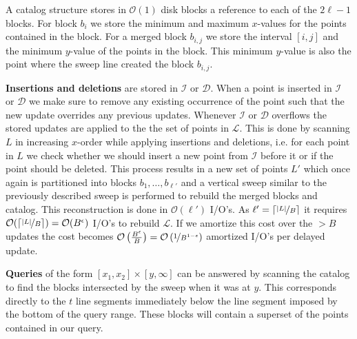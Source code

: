 \documentclass[twoside,11pt,openright]{report}
\begin{document}
A catalog structure stores in $\mathcal{O}(1)$ disk blocks a reference to each of the $2\ell-1$ blocks. For block $b_i$ we store the minimum and maximum $x$-values for the points contained in the block. For a merged block $b_{i,j}$ we store the interval $\left[ i,j\right]$ and the minimum $y$-value of the points in the block. This minimum $y$-value is also the point where the sweep line created the block $b_{i,j}$.


\textbf{Insertions and deletions} are stored in $\mathcal{I}$ or $\mathcal{D}$. When a point is inserted in $\mathcal{I}$ or $\mathcal{D}$ we make sure to remove any existing occurrence of the point such that the new update overrides any previous updates. Whenever $\mathcal{I}$ or $\mathcal{D}$ overflows the stored updates are applied to the the set of points in $\mathcal{L}$. This is done by scanning $L$ in increasing $x$-order while applying insertions and deletions, i.e. for each point in $L$ we check whether we should insert a new point from $\mathcal{I}$ before it or if the point should be deleted. This process results in a new set of points $L'$ which once again is partitioned into blocks $b_1,\dots,b_{\ell'}$ and a vertical sweep similar to the previously described sweep is performed to rebuild the merged blocks and catalog.
This reconstruction is done in $\mathcal{O}(\ell')$ I/O's. As $\ell' = \lceil \nicefrac{\vert L \vert}{B}\rceil$ it requires $\mathcal{O}(\lceil \nicefrac{\vert L \vert}{B}\rceil) = \mathcal{O}(B^\epsilon)$ I/O's to rebuild $\mathcal{L}$. If we amortize this cost over the $>B$ updates the cost becomes $\mathcal{O}\left(\frac{B^\epsilon}{B}\right) = \mathcal{O}\left(\nicefrac{1}{B^{1-\epsilon}}\right)$ amortized I/O's per delayed update.

\textbf{Queries} of the form $[x_1,x_2] \times [y,\infty]$ can be answered by scanning the catalog to find the blocks intersected by the sweep when it was at $y$. This corresponds directly to the $t$ line segments immediately below the line segment imposed by the bottom of the query range. These blocks will contain a superset of the points contained in our query.
\end{document}

